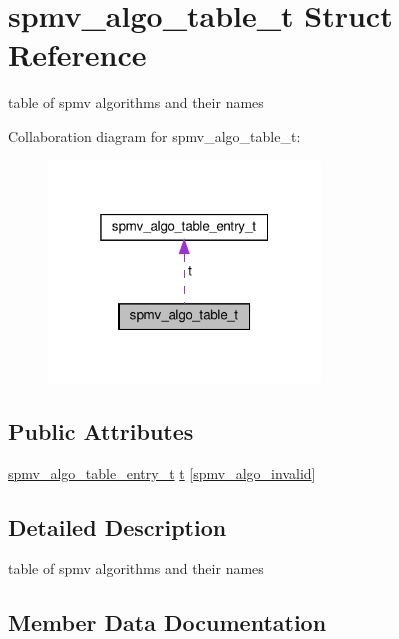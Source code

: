 \hypertarget{structspmv__algo__table__t}{}\section{spmv\+\_\+algo\+\_\+table\+\_\+t Struct Reference}
\label{structspmv__algo__table__t}


table of spmv algorithms and their names  




Collaboration diagram for spmv\+\_\+algo\+\_\+table\+\_\+t\+:\nopagebreak
\begin{figure}[H]
\begin{center}
\leavevmode
\includegraphics[width=205pt]{structspmv__algo__table__t__coll__graph}
\end{center}
\end{figure}
\subsection*{Public Attributes}
\begin{DoxyCompactItemize}
\item 
\hyperlink{structspmv__algo__table__entry__t}{spmv\+\_\+algo\+\_\+table\+\_\+entry\+\_\+t} \hyperlink{structspmv__algo__table__t_a8cc8ce6a17f236df757787d28ae93315}{t} \mbox{[}\hyperlink{spmv_8cc_ad2cf0493af54bf76c5be68b4634fcab7add2a1e0329d677ee5f5fcc7ee8077dd0}{spmv\+\_\+algo\+\_\+invalid}\mbox{]}
\end{DoxyCompactItemize}


\subsection{Detailed Description}
table of spmv algorithms and their names 

\subsection{Member Data Documentation}
\mbox{\label{structspmv__algo__table__t_a8cc8ce6a17f236df757787d28ae93315}} 
